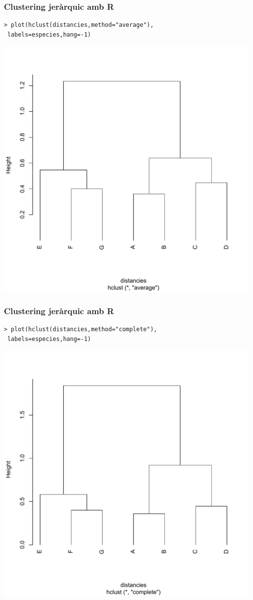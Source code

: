\documentclass[12pt,t]{beamer}
\theoremstyle{plain}
\theoremstyle{definition}
\begin{document}
\begin{frame}[fragile]
\frametitle{Clustering jeràrquic amb R}

\begin{verbatim}
> plot(hclust(distancies,method="average"),
 labels=especies,hang=-1)
\end{verbatim}
\begin{center}
\includegraphics[width=0.7\linewidth]{Rplot3.pdf}
\end{center}
\end{frame}

\begin{frame}[fragile]
\frametitle{Clustering jeràrquic amb R}

\begin{verbatim}
> plot(hclust(distancies,method="complete"),
 labels=especies,hang=-1)
\end{verbatim}
\begin{center}
\includegraphics[width=0.7\linewidth]{Rplot4.pdf}
\end{center}
\end{frame}
\end{document}
